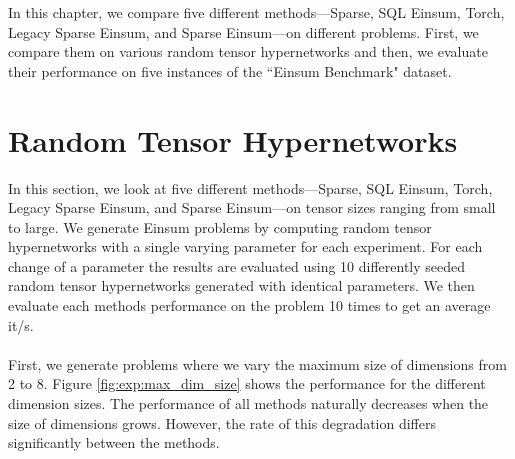 
In this chapter, we compare five different methods—Sparse, SQL Einsum, Torch, Legacy Sparse 
Einsum, and Sparse Einsum—on different problems. First, we compare them on various random
tensor hypernetworks and then, we evaluate their performance on five instances of the ``Einsum
Benchmark" \cite{einsum_benchmark} dataset.

\section{Random Tensor Hypernetworks}
In this section, we look at five different methods—Sparse, SQL Einsum, Torch, Legacy Sparse 
Einsum, and Sparse Einsum—on tensor sizes ranging from small to large. We generate Einsum 
problems by computing random tensor hypernetworks with a single varying parameter for each 
experiment. For each change of a parameter the results are evaluated using 10 differently 
seeded random tensor hypernetworks generated with identical parameters. We then evaluate 
each methods performance on the problem 10 times to get an average it/s.
\\
\\
First, we generate problems where we vary the maximum size of dimensions from 2 to 8. 
Figure \ref{fig:exp:max_dim_size} shows the performance for the different dimension sizes. 
The performance of all methods naturally decreases when the size of dimensions grows. However, 
the rate of this degradation differs significantly between the methods.

